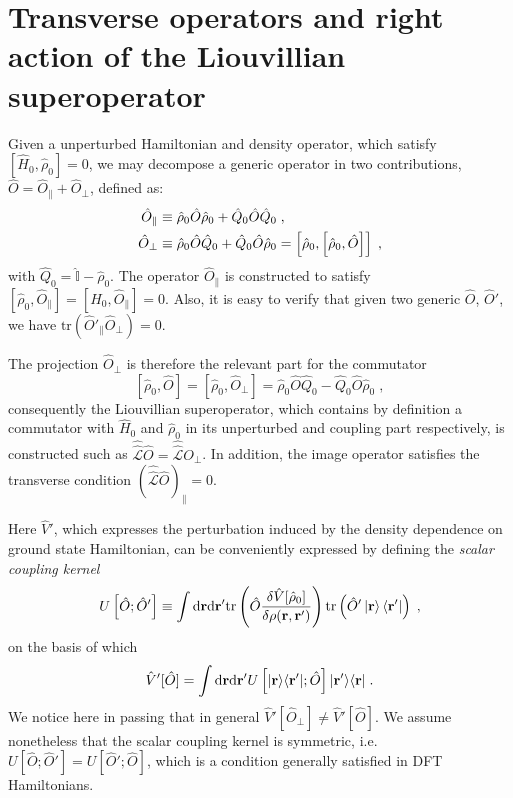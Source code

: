 \documentclass[reprint,aps,prb]{revtex4-1}
\newcommand{\dd}{{\rm d}}
\renewcommand{\r}{{\bf r}}
\newcommand{\be}{\begin{equation}}
\newcommand{\ee}{\end{equation}}
\newcommand{\nn}{\notag}
\newcommand{\lb}{\label}
\newcommand{\op}[1]{\hat {#1}}
\newcommand{\sop}[1]{\op{\op {#1}}}
\newcommand{\commutator}[2]{\left[ {#1} , {#2} \right]}
\newcommand{\trace}[1]{\mathrm{tr}\left(#1\right)}
\newcommand{\ketbra}[2]{| #1 \rangle \langle #2 |}
\newcommand{\dmnot}{\op{\rho}_0}
\newcommand{\hnot}{\op{H}_0}
\newcommand{\Liouv}{\sop{\mathcal L}}
\newcommand{\identity}{\op{\mathbb I}}
\begin{document}
\appendix
\section{Transverse operators and right action of the Liouvillian superoperator}\lb{LiouvillianAction}
Given a unperturbed Hamiltonian and density operator, which satisfy $\commutator{\hnot}{\dmnot}=0$, we may decompose a generic operator in two contributions, $\op O=\op O_\parallel + \op O_\perp$, defined as:
\begin{align}
\op O_\parallel &\equiv \dmnot \op O \dmnot + \op Q_0 \op O \op Q_0 \nn \;,\\
\op O_\perp &\equiv \dmnot \op O \op Q_0 +  \op Q_0 \op O \dmnot =
\commutator{\dmnot}{\commutator{\dmnot}{\op O}} \;,
\end{align}
with $\op Q_0 =\identity - \dmnot$.
The operator $\op O_\parallel$ is constructed to satisfy
$\commutator{\dmnot}{\op O_\parallel} = \commutator{\hnot}{\op O_\parallel} =0$.
Also, it is easy to verify that given two generic $\op O$, $\op O'$, we have
$\trace{\op O'_\parallel \op O_\perp} =0$.

The projection $\op O_\perp$ is therefore the relevant part for the commutator
\begin{equation}
\commutator{\dmnot}{\op O} = \commutator{\dmnot}{\op O_\perp} =
\dmnot \op O \op Q_0  - \op Q_0 \op O \dmnot  \;,
\end{equation}
consequently the Liouvillian superoperator, which contains by definition a commutator with $\hnot$ and $\dmnot$ in its unperturbed and coupling part respectively,
is constructed such as $\Liouv \op O = \Liouv O_\perp$. In addition, the image operator satisfies the transverse condition
$\left( \Liouv \op O \right)_\parallel =0$.

Here $\op V'$, which expresses the perturbation induced by the density dependence on ground state Hamiltonian, can be conveniently expressed by defining the
\emph{scalar coupling kernel}
\be\lb{CouplingKernelDef1}
U\left[\op O; \op O'\right] \equiv  \int \dd \r \dd \r' \trace{\op O \frac{\delta \op V[\dmnot] }{\delta \rho(\r,\r')}
} \trace{\op O' \ket{\r} \bra{\r'}}\;,
\ee
on the basis of which
\be\lb{VpDef1}
\op V'[\op O]=
\int \dd \r \dd \r' U\left[\ketbra{\r}{\r'};\op O\right] \ketbra{\r'}{\r}\;.
\ee
We notice here in passing that in general $\op V'[\op O_\perp] \neq \op V'[\op O]$.
We assume nonetheless that the scalar coupling kernel is symmetric, i.e. $U\left[\op O; \op O'\right] = U\left[\op O'; \op O\right]$, which is a condition generally satisfied in DFT Hamiltonians.
\end{document}
